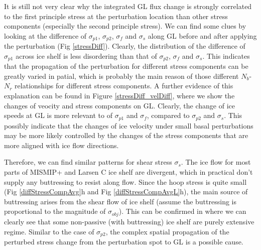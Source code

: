 \documentclass[review,oneside]{igs}
\begin{document}

It is still not very clear why the integrated GL flux change is strongly correlated to the first principle stress at the perturbation location than other stress components (especially the second principle stress). We can find some clues by looking at the difference of $\sigma_{p1}$, $\sigma_{p2}$, $\sigma_f$ and $\sigma_s$ along GL before and after applying the perturbation (Fig \ref{stressDiff}). Clearly, the distribution of the difference of $\sigma_{p1}$ across ice shelf is less disordering than that of $\sigma_{p2}$, $\sigma_{f}$ and $\sigma_{s}$. This indicates that the propagation of the perturbation for different stress components can be greatly varied in patial, which is probably the main reason of those different $N_b$-$N_r$ relationships for different stress components. A further evidence of this explanation can be found in Figure \ref{stressDiff_velDiff}, where we show the changes of veocity and stress components on GL. Clearly, the change of ice speeds at GL is more relevant to of $\sigma_{p1}$ and $\sigma_{f}$, compared to $\sigma_{p2}$ and $\sigma_{s}$. This possibly indicate that the changes of ice velocity under small basal perturbations may be more likely controlled by the changes of the stress components that are more aligned with ice flow directions.


Therefore, we can find similar patterns for shear stress $\sigma_s$. The ice flow for most parts of MISMIP+ and Larsen C ice shelf are divergent, which in practical don't supply any buttressing to resist along flow. Since the hoop stress is quite small (Fig \ref{diffStressCompAvg}h and Fig \ref{diffStressCompAvgL}h), the main source of buttressing arises from the shear flow of ice shelf (assume the buttressing is proportional to the magnitude of $\sigma_{obj}$). This can be confirmed in \citep{furst2016} where we can clearly see that some non-passive (with buttressing) ice shelf are purely extensive regime. Similar to the case of $\sigma_{p2}$, the complex spatial propagation of the perturbed stress change from the perturbation spot to GL is a possible cause.
\end{document}
